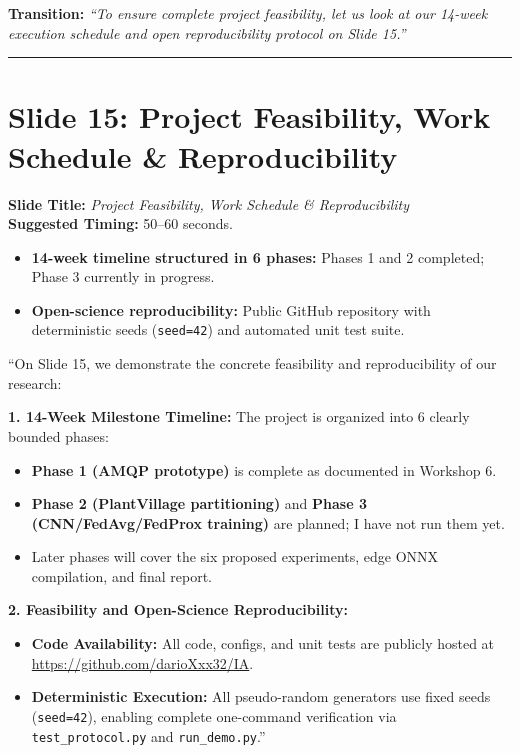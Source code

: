 \documentclass[11pt,a4paper]{article}
\begin{document}
\textbf{Transition:} \textit{``To ensure complete project feasibility, let us look at our 14-week execution schedule and open reproducibility protocol on Slide 15.''}

\vspace{0.35cm}\hrule\vspace{0.35cm}

\section{Slide 15: Project Feasibility, Work Schedule \& Reproducibility}
\textbf{Slide Title:} \textit{Project Feasibility, Work Schedule \& Reproducibility} \\
\textbf{Suggested Timing:} 50--60 seconds.

\begin{tcolorbox}[colframe=primaryblue, title=\textbf{Key Points to Emphasize}]
\begin{itemize}[leftmargin=*]
    \item \textbf{14-week timeline structured in 6 phases:} Phases 1 and 2 completed; Phase 3 currently in progress.
    \item \textbf{Open-science reproducibility:} Public GitHub repository with deterministic seeds (\texttt{seed=42}) and automated unit test suite.
\end{itemize}
\end{tcolorbox}

\begin{tcolorbox}[colframe=darkgreen, title=\textbf{What to Say in the Presentation (Literal Script)}]
``On Slide 15, we demonstrate the concrete feasibility and reproducibility of our research:

\textbf{1. 14-Week Milestone Timeline:}
The project is organized into 6 clearly bounded phases:
\begin{itemize}
    \item \textbf{Phase 1 (AMQP prototype)} is complete as documented in Workshop 6.
    \item \textbf{Phase 2 (PlantVillage partitioning)} and \textbf{Phase 3 (CNN/FedAvg/FedProx training)} are planned; I have not run them yet.
    \item Later phases will cover the six proposed experiments, edge ONNX compilation, and final report.
\end{itemize}

\textbf{2. Feasibility and Open-Science Reproducibility:}
\begin{itemize}
    \item \textbf{Code Availability:} All code, configs, and unit tests are publicly hosted at \url{https://github.com/darioXxx32/IA}.
    \item \textbf{Deterministic Execution:} All pseudo-random generators use fixed seeds (\texttt{seed=42}), enabling complete one-command verification via \texttt{test\_protocol.py} and \texttt{run\_demo.py}.''
\end{itemize}
\end{tcolorbox}
\end{document}

